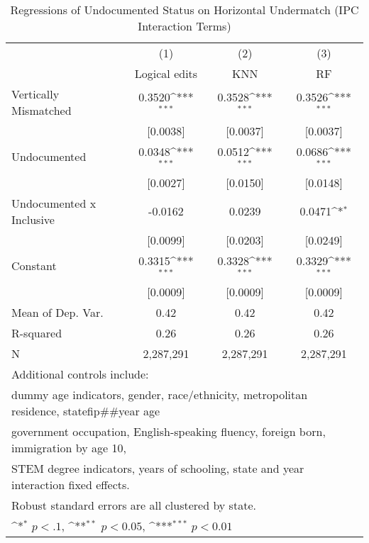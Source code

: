 \begin{table}[htbp]\centering
\def\sym#1{\ifmmode^{#1}\else\(^{#1}\)\fi}
\caption{Regressions of Undocumented Status on Horizontal Undermatch (IPC Interaction Terms)}
\begin{tabular}{l*{3}{c}}
\toprule
                    &\multicolumn{1}{c}{(1)}         &\multicolumn{1}{c}{(2)}         &\multicolumn{1}{c}{(3)}         \\
                    &Logical edits         &         KNN         &          RF         \\
\midrule
Vertically Mismatched&      0.3520\sym{***}&      0.3528\sym{***}&      0.3526\sym{***}\\
                    &    [0.0038]         &    [0.0037]         &    [0.0037]         \\
\addlinespace
Undocumented        &      0.0348\sym{***}&      0.0512\sym{***}&      0.0686\sym{***}\\
                    &    [0.0027]         &    [0.0150]         &    [0.0148]         \\
\addlinespace
Undocumented x Inclusive&     -0.0162         &      0.0239         &      0.0471\sym{*}  \\
                    &    [0.0099]         &    [0.0203]         &    [0.0249]         \\
\addlinespace
Constant            &      0.3315\sym{***}&      0.3328\sym{***}&      0.3329\sym{***}\\
                    &    [0.0009]         &    [0.0009]         &    [0.0009]         \\
\midrule
Mean of Dep. Var.   &        0.42         &        0.42         &        0.42         \\
R-squared           &        0.26         &        0.26         &        0.26         \\
N                   &   2,287,291         &   2,287,291         &   2,287,291         \\
\bottomrule
\multicolumn{4}{l}{\footnotesize Additional controls include:}\\
\multicolumn{4}{l}{\footnotesize dummy age indicators, gender, race/ethnicity, metropolitan residence, statefip##year age}\\
\multicolumn{4}{l}{\footnotesize government occupation, English-speaking fluency, foreign born, immigration by age 10,}\\
\multicolumn{4}{l}{\footnotesize STEM degree indicators, years of schooling, state and year interaction fixed effects.}\\
\multicolumn{4}{l}{\footnotesize Robust standard errors are all clustered by state.}\\
\multicolumn{4}{l}{\footnotesize \sym{*} \(p<.1\), \sym{**} \(p<0.05\), \sym{***} \(p<0.01\)}\\
\end{tabular}
\end{table}
